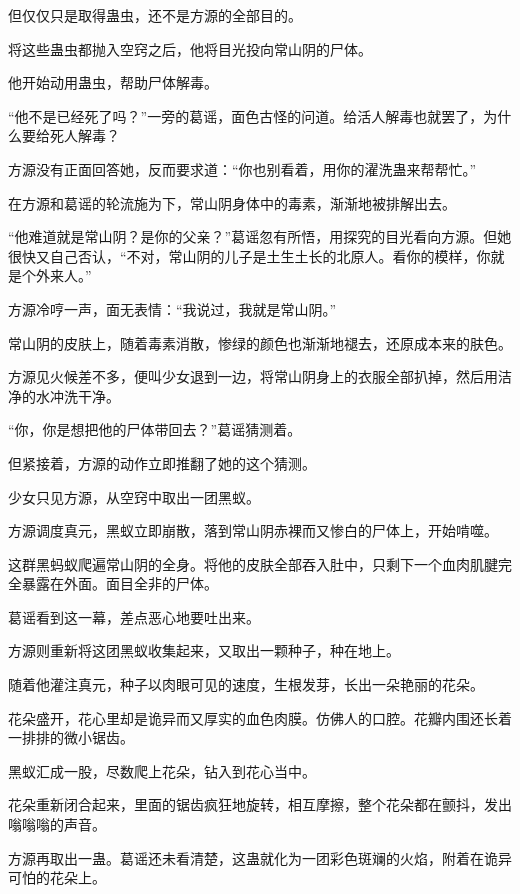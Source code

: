 
\begin{this_body}



但仅仅只是取得蛊虫，还不是方源的全部目的。

将这些蛊虫都抛入空窍之后，他将目光投向常山阴的尸体。

他开始动用蛊虫，帮助尸体解毒。

“他不是已经死了吗？”一旁的葛谣，面色古怪的问道。给活人解毒也就罢了，为什么要给死人解毒？

方源没有正面回答她，反而要求道：“你也别看着，用你的濯洗蛊来帮帮忙。”

在方源和葛谣的轮流施为下，常山阴身体中的毒素，渐渐地被排解出去。

“他难道就是常山阴？是你的父亲？”葛谣忽有所悟，用探究的目光看向方源。但她很快又自己否认，“不对，常山阴的儿子是土生土长的北原人。看你的模样，你就是个外来人。”

方源冷哼一声，面无表情：“我说过，我就是常山阴。”

常山阴的皮肤上，随着毒素消散，惨绿的颜色也渐渐地褪去，还原成本来的肤色。

方源见火候差不多，便叫少女退到一边，将常山阴身上的衣服全部扒掉，然后用洁净的水冲洗干净。

“你，你是想把他的尸体带回去？”葛谣猜测着。

但紧接着，方源的动作立即推翻了她的这个猜测。

少女只见方源，从空窍中取出一团黑蚁。

方源调度真元，黑蚁立即崩散，落到常山阴赤裸而又惨白的尸体上，开始啃噬。

这群黑蚂蚁爬遍常山阴的全身。将他的皮肤全部吞入肚中，只剩下一个血肉肌腱完全暴露在外面。面目全非的尸体。

葛谣看到这一幕，差点恶心地要吐出来。

方源则重新将这团黑蚁收集起来，又取出一颗种子，种在地上。

随着他灌注真元，种子以肉眼可见的速度，生根发芽，长出一朵艳丽的花朵。

花朵盛开，花心里却是诡异而又厚实的血色肉膜。仿佛人的口腔。花瓣内围还长着一排排的微小锯齿。

黑蚁汇成一股，尽数爬上花朵，钻入到花心当中。

花朵重新闭合起来，里面的锯齿疯狂地旋转，相互摩擦，整个花朵都在颤抖，发出嗡嗡嗡的声音。

方源再取出一蛊。葛谣还未看清楚，这蛊就化为一团彩色斑斓的火焰，附着在诡异可怕的花朵上。


\end{this_body}
